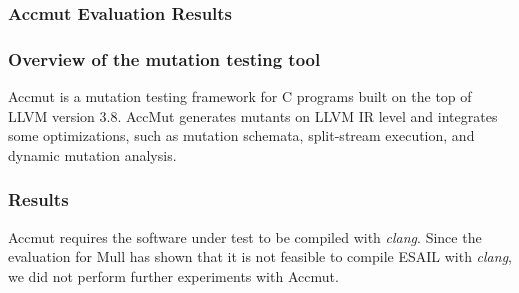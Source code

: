 \subsubsection{Accmut Evaluation Results}
\label{subsec:dextool}

\subsubsection{Overview of the mutation testing tool}

Accmut is a mutation testing framework for C programs built on the top of LLVM version 3.8. AccMut generates mutants on LLVM IR level and integrates some optimizations, such as mutation schemata, split-stream execution, and dynamic mutation analysis.

\subsubsection{Results}

Accmut requires the software under test to be compiled with \emph{clang}.
Since the evaluation for Mull has shown that it is not feasible to compile ESAIL with \emph{clang}, we did not perform further experiments with Accmut.


